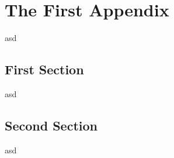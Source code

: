 \chapter{The First Appendix}
\label{app:first-app}
asd
\section{First Section}
asd
\section{Second Section}
asd